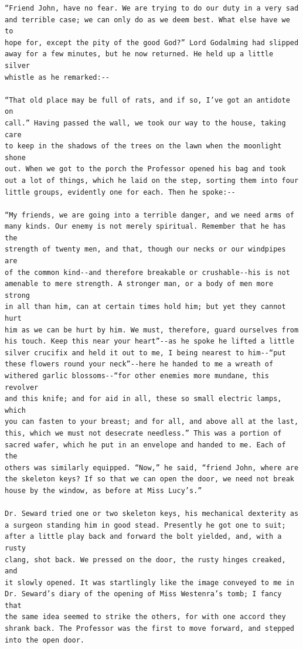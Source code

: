 \documentclass{article}
\begin{document}
\begin{verbatim}
“Friend John, have no fear. We are trying to do our duty in a very sad
and terrible case; we can only do as we deem best. What else have we to
hope for, except the pity of the good God?” Lord Godalming had slipped
away for a few minutes, but he now returned. He held up a little silver
whistle as he remarked:--

“That old place may be full of rats, and if so, I’ve got an antidote on
call.” Having passed the wall, we took our way to the house, taking care
to keep in the shadows of the trees on the lawn when the moonlight shone
out. When we got to the porch the Professor opened his bag and took
out a lot of things, which he laid on the step, sorting them into four
little groups, evidently one for each. Then he spoke:--

“My friends, we are going into a terrible danger, and we need arms of
many kinds. Our enemy is not merely spiritual. Remember that he has the
strength of twenty men, and that, though our necks or our windpipes are
of the common kind--and therefore breakable or crushable--his is not
amenable to mere strength. A stronger man, or a body of men more strong
in all than him, can at certain times hold him; but yet they cannot hurt
him as we can be hurt by him. We must, therefore, guard ourselves from
his touch. Keep this near your heart”--as he spoke he lifted a little
silver crucifix and held it out to me, I being nearest to him--“put
these flowers round your neck”--here he handed to me a wreath of
withered garlic blossoms--“for other enemies more mundane, this revolver
and this knife; and for aid in all, these so small electric lamps, which
you can fasten to your breast; and for all, and above all at the last,
this, which we must not desecrate needless.” This was a portion of
sacred wafer, which he put in an envelope and handed to me. Each of the
others was similarly equipped. “Now,” he said, “friend John, where are
the skeleton keys? If so that we can open the door, we need not break
house by the window, as before at Miss Lucy’s.”

Dr. Seward tried one or two skeleton keys, his mechanical dexterity as
a surgeon standing him in good stead. Presently he got one to suit;
after a little play back and forward the bolt yielded, and, with a rusty
clang, shot back. We pressed on the door, the rusty hinges creaked, and
it slowly opened. It was startlingly like the image conveyed to me in
Dr. Seward’s diary of the opening of Miss Westenra’s tomb; I fancy that
the same idea seemed to strike the others, for with one accord they
shrank back. The Professor was the first to move forward, and stepped
into the open door.


\end{verbatim}
\end{document}
